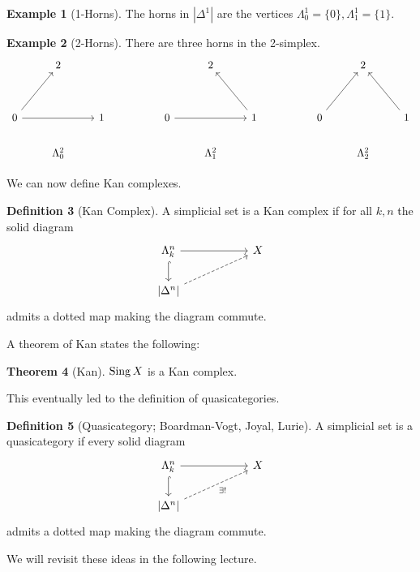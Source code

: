 \documentclass{amsart}
\theoremstyle{definition}
\newtheorem{theorem}{Theorem}[section]
\newtheorem{example}[theorem]{Example}
\newtheorem{definition}[theorem]{Definition}
\numberwithin{equation}{section}
\begin{document}
\begin{example}[1-Horns]
  The horns in $|\Delta^{1}|$ are the vertices $\Lambda^{1}_{0}=\{0\}, \Lambda^{1}_{1}=\{1\}$. 
\end{example}
\begin{example}[2-Horns]
  There are three horns in the 2-simplex. 
  $$%
  \begin{tikzcd}
    & 2 &&&& 2 & {} &&& 2 \\
    \\
    0 && 1 && 0 && 1 && 0 && 1 \\
    & {\Lambda^{2}_{0}} &&&& {\Lambda^{2}_{1}} &&&& {\Lambda^{2}_{2}}
    \arrow[from=3-1, to=1-2]
    \arrow[from=3-1, to=3-3]
    \arrow[from=3-5, to=3-7]
    \arrow[from=3-7, to=1-6]
    \arrow[from=3-9, to=1-10]
    \arrow[from=3-11, to=1-10]
  \end{tikzcd}$$
\end{example}
We can now define Kan complexes. 
\begin{definition}[Kan Complex]
  A simplicial set is a Kan complex if for all $k,n$ the solid diagram
  $$%
  \begin{tikzcd}
    {\Lambda^{n}_{k}} & {} & X \\
    {|\Delta^{n}|}
    \arrow[from=1-1, to=1-3]
    \arrow[dashed, from=2-1, to=1-3]
    \arrow[hook, from=1-1, to=2-1]
  \end{tikzcd}$$
  admits a dotted map making the diagram commute. 
\end{definition}
A theorem of Kan states the following:
\begin{theorem}[Kan]
  $\operatorname{Sing} X$ is a Kan complex. 
\end{theorem}
This eventually led to the definition of quasicategories. 
\begin{definition}[Quasicategory; Boardman-Vogt, Joyal, Lurie]
  A simplicial set is a quasicategory if every solid diagram
  $$%
  \begin{tikzcd}
    {\Lambda^{n}_{k}} & {} & X \\
    {|\Delta^{n}|}
    \arrow[from=1-1, to=1-3]
    \arrow["{\exists!}"', dashed, from=2-1, to=1-3]
    \arrow[hook, from=1-1, to=2-1]
  \end{tikzcd}$$
  admits a dotted map making the diagram commute. 
\end{definition}
We will revisit these ideas in the following lecture. 
\newpage
\printbibliography
\end{document}
